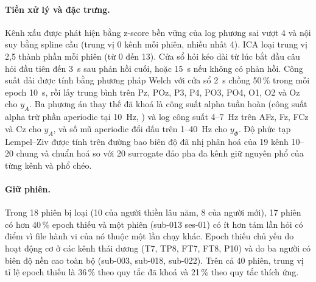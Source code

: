 \paragraph{Tiền xử lý và đặc trưng.} Kênh xấu được phát hiện bằng z-score bền vững của log phương sai vượt 4 và nội suy bằng spline cầu (trung vị 0 kênh mỗi phiên, nhiều nhất 4). ICA loại trung vị 2,5 thành phần mỗi phiên (từ 0 đến 13). Cửa sổ hỏi kéo dài từ lúc bắt đầu câu hỏi đầu tiên đến 3~s sau phản hồi cuối, hoặc 15~s nếu không có phản hồi. Công suất dải được tính bằng phương pháp Welch với cửa sổ 2~s chồng 50\,\% trong mỗi epoch 10~s, rồi lấy trung bình trên Pz, POz, P3, P4, PO3, PO4, O1, O2 và Oz cho $y_A$. Ba phương án thay thế đã khoá là công suất alpha tuần hoàn (công suất alpha trừ phần aperiodic tại 10~Hz, \citealp{Donoghue2020}) và log công suất 4--7~Hz trên AFz, Fz, FCz và Cz cho $y_A$, và số mũ aperiodic đổi dấu trên 1--40~Hz cho $y_\Phi$. Độ phức tạp Lempel--Ziv được tính trên đường bao biên độ đã nhị phân hoá của 19 kênh 10--20 chung và chuẩn hoá so với 20 surrogate đảo pha đa kênh giữ nguyên phổ của từng kênh và phổ chéo.

\paragraph{Giữ phiên.} Trong 18 phiên bị loại (10 của người thiền lâu năm, 8 của người mới), 17 phiên có hơn 40\,\% epoch thiếu và một phiên (sub-013 ses-01) có ít hơn tám lần hỏi có điểm vì file hành vi của nó thuộc một lần chạy khác. Epoch thiếu chủ yếu do hoạt động cơ ở các kênh thái dương (T7, TP8, FT7, FT8, P10) và do ba người có biên độ nền cao toàn bộ (sub-003, sub-018, sub-022). Trên cả 40 phiên, trung vị tỉ lệ epoch thiếu là 36\,\% theo quy tắc đã khoá và 21\,\% theo quy tắc thích ứng.

